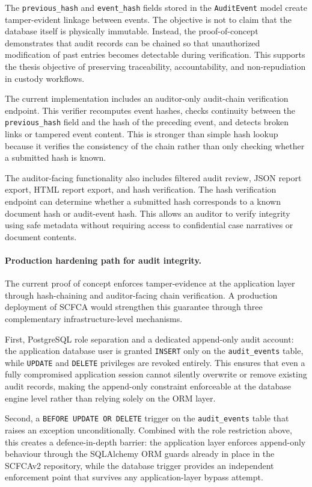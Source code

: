 \documentclass[12pt,a4paper]{report}
\begin{document}
The \texttt{previous\_hash} and \texttt{event\_hash} fields stored in the
\texttt{AuditEvent} model create tamper-evident linkage between events. The objective
is not to claim that the database itself is physically immutable. Instead, the
proof-of-concept demonstrates that audit records can be chained so that unauthorized
modification of past entries becomes detectable during verification. This supports the
thesis objective of preserving traceability, accountability, and non-repudiation in
custody workflows.

The current implementation includes an auditor-only audit-chain verification endpoint.
This verifier recomputes event hashes, checks continuity between the
\texttt{previous\_hash} field and the hash of the preceding event, and detects broken
links or tampered event content. This is stronger than simple hash lookup because it
verifies the consistency of the chain rather than only checking whether a submitted hash
is known.

The auditor-facing functionality also includes filtered audit review, JSON report
export, HTML report export, and hash verification. The hash verification endpoint can
determine whether a submitted hash corresponds to a known document hash or
audit-event hash. This allows an auditor to verify integrity using safe metadata without
requiring access to confidential case narratives or document contents.

\paragraph{Production hardening path for audit integrity.}
The current proof of concept enforces tamper-evidence at the application layer through
hash-chaining and auditor-facing chain verification. A production deployment of SCFCA
would strengthen this guarantee through three complementary infrastructure-level
mechanisms.

First, PostgreSQL role separation and a dedicated append-only audit account: the
application database user is granted \texttt{INSERT} only on the \texttt{audit\_events}
table, while \texttt{UPDATE} and \texttt{DELETE} privileges are revoked entirely. This
ensures that even a fully compromised application session cannot silently overwrite or
remove existing audit records, making the append-only constraint enforceable at the
database engine level rather than relying solely on the ORM layer.

Second, a \texttt{BEFORE UPDATE OR DELETE} trigger on the \texttt{audit\_events} table
that raises an exception unconditionally. Combined with the role restriction above, this
creates a defence-in-depth barrier: the application layer enforces append-only behaviour
through the SQLAlchemy ORM guards already in place in the SCFCAv2 repository, while
the database trigger provides an independent enforcement point that survives any
application-layer bypass attempt.
\end{document}

